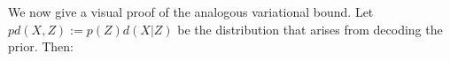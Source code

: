 \documentclass[twoside]{article}
\makeatletter
\theoremstyle{plain}
\theoremstyle{definition}
\newcommand\aar{\@ifstar\aar@one@star\aar@plain}
\newcommand\aar@one@star{\@ifstar\aar@resize{\aar@plain*}}
\newcommand\aar@resize[1]{\sbox{\aar@content}{#1}\scaleleftright[3.8ex]
			{\Biggl\langle\!\!\!\!\Biggl\langle}{\usebox{\aar@content}}
			{\Biggr\rangle\!\!\!\!\Biggr\rangle}}
\makeatother
\begin{document}
%
We now give a visual proof of the analogous variational bound.
Let $pd(X,Z) := p(Z)d(X|Z)$ be
the distribution that arises from decoding the prior. Then:
\end{document}
